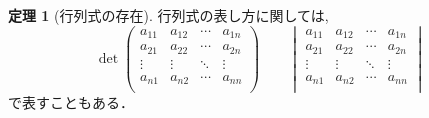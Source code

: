 \documentclass[dvipdfmx,a4paper,11pt]{article}
\theoremstyle{definition}
\newtheorem{thm}{定理}
\begin{document}
\begin{tcolorbox}[
    colback = white,
    colframe = green!35!black,
    fonttitle = \bfseries,
    breakable = true]
\begin{thm}[行列式の存在]
  行列式の表し方に関しては, 
  $$
  \det\begin{pmatrix}
a_{11}& a_{12} & \cdots &a_{1n} \\
a_{21}& a_{22} & \cdots &a_{2n} \\
\vdots& \vdots	&	\ddots   &	\vdots \\
a_{n1}& a_{n2} & \cdots &a_{nn} \\
\end{pmatrix}
\quad
\text{}
\quad
\begin{vmatrix}
a_{11}& a_{12} & \cdots &a_{1n} \\
a_{21}& a_{22} & \cdots &a_{2n} \\
\vdots& \vdots	&	\ddots   &	\vdots \\
a_{n1}& a_{n2} & \cdots &a_{nn} \\
\end{vmatrix}
  $$
  で表すこともある． 
    \end{thm}
 \end{tcolorbox}
 
\end{document}

